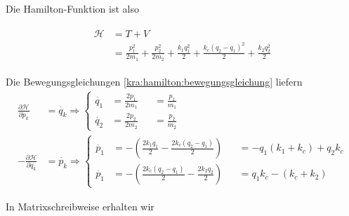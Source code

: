 Die Hamilton-Funktion ist also

\begin{align*}
    \begin{split}
        \mathcal{H}     &= T + V \\
        &= \frac{p_1^2}{2m_1} + \frac{p_2^2}{2m_2} + \frac{k_1 q_1^2}{2} + \frac{k_c (q_2 - q_1)^2}{2} + \frac{k_2 q_2^2}{2}
    \end{split}
\end{align*}

Die Bewegungsgleichungen \ref{kra:hamilton:bewegungsgleichung} liefern
\begin{align*}
    \frac{\partial \mathcal{H}}{\partial p_k}  & = \dot{q_k}
    \Rightarrow
    \left\{
    \begin{alignedat}{2}
        \dot{q_1}   &= \frac{2p_1}{2m_1}    &&= \frac{p_1}{m_1}\\
        \dot{q_2}   &= \frac{2p_2}{2m_2}    &&= \frac{p_2}{m_2}
    \end{alignedat}
    \right.
    \\
    -\frac{\partial \mathcal{H}}{\partial q_k} & = \dot{p_k}
    \Rightarrow
    \left\{
    \begin{alignedat}{2}
        \dot{p_1}   &= -(\frac{2k_1q_1}{2} - \frac{2k_c(q_2-q_1)}{2})  &&= -q_1(k_1+k_c) + q_2k_c \\
        \dot{p_1}   &= -(\frac{2k_c(q_2-q_1)}{2} - \frac{2k_2q_2}{2})  &&= q_1k_c - (k_c + k_2)
    \end{alignedat}
    \right.
\end{align*}

In Matrixschreibweise erhalten wir

